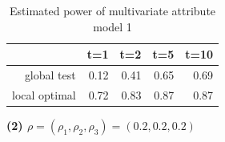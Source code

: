 \documentclass[12pt]{report}
\begin{document}
\begin{table}[ht]
\centering
\begin{tabular}{rrrrr}
  \hline
 & t=1 & t=2 & t=5 & t=10 \\ 
  \hline
global test & 0.12 & 0.41 & 0.65 & 0.69 \\ 
  local optimal & 0.72 & 0.83 & 0.87 & 0.87 \\ 
   \hline
\end{tabular}
\caption{Estimated power of multivariate attribute model 1}
\end{table}




\newpage
\textbf{(2) $\rho = (\rho_{1}, \rho_{2}, \rho_{3}) = (0.2, 0.2, 0.2)$}


\begin{figure}[H]
\captionsetup{format=plain}
\centering
{}

\end{figure}
\end{document}
